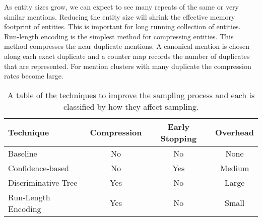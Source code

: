 As entity sizes grow, we can expect to see many repeats of the same or very similar mentions.
Reducing the entity size will shrink the effective memory footprint of entities.
This is important for long running collection of entities.
Run-length encoding is the simplest method for compressing entities.
This method compresses the near duplicate mentions.
A canonical mention is chosen along each exact duplicate and a counter map records the number of duplicates that are represented.
For mention clusters with many duplicate the compression rates become large.




\begin{table*}[t]
\centering
\begin{tabular}{l| c c c}
\textbf{Technique} &
\textbf{Compression} &
\textbf{Early Stopping} &
\textbf{Overhead}\\
\hline
Baseline & No & No & None \\
Confidence-based~\cite{singh2012monte} & No & Yes & Medium\\
Discriminative Tree~\cite{wick2013discriminative} & Yes & No & Large\\
Run-Length Encoding & Yes & No & Small\\
\end{tabular}
\caption{A table of the techniques to improve the sampling process and each is classified by how they affect sampling.}
\label{tab:acceleration-approach}
\end{table*}


